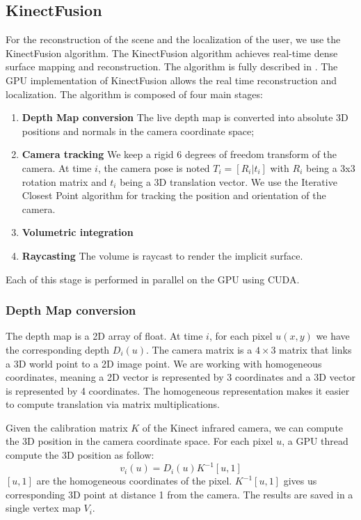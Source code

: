 \documentclass[12pt]{article}
\begin{document}
\subsection{KinectFusion}
For the reconstruction of the scene and the localization of the user, we use the KinectFusion algorithm. The KinectFusion algorithm achieves real-time dense surface mapping and reconstruction. The algorithm is fully described in \cite{KF1, KF2}. The GPU implementation of KinectFusion allows the real time reconstruction and localization. The algorithm is composed of four main stages:
\begin{enumerate}
\item \textbf{Depth Map conversion} The live depth map is converted into absolute 3D positions and normals in the camera coordinate space;
\item \textbf{Camera tracking} We keep a rigid 6 degrees of freedom transform of the camera. At time $i$, the camera pose is noted $T_i = [R_i|t_i]$ with $R_i$ being a 3x3 rotation matrix and $t_i$ being a 3D translation vector. We use the Iterative Closest Point algorithm for tracking the position and orientation of the camera.
\item \textbf{Volumetric integration}
\item \textbf{Raycasting} The volume is raycast to render the implicit surface.
\end{enumerate}

Each of this stage is performed in parallel on the GPU using CUDA.

\subsubsection{Depth Map conversion}
The depth map is a 2D array of float. At time $i$, for each pixel $u(x,y)$ we have the corresponding depth $D_i(u)$. The camera matrix is a $4\times 3$ matrix that links a 3D world point to a 2D image point. We are working with homogeneous coordinates, meaning a 2D vector is represented by 3 coordinates and a 3D vector is represented by 4 coordinates. The homogeneous representation makes it easier to compute translation via matrix multiplications.

Given the calibration matrix $K$ of the Kinect infrared camera, we can compute the 3D position in the camera coordinate space. For each pixel $u$, a GPU thread compute the 3D position as follow:
$$v_i(u) = D_i(u)K^{-1}[u,1]$$
$[u,1]$ are the homogeneous coordinates of the pixel. $K^{-1}[u,1]$ gives us corresponding 3D point at distance 1 from the camera. The results are saved in a single vertex map $V_i$.
\end{document}
